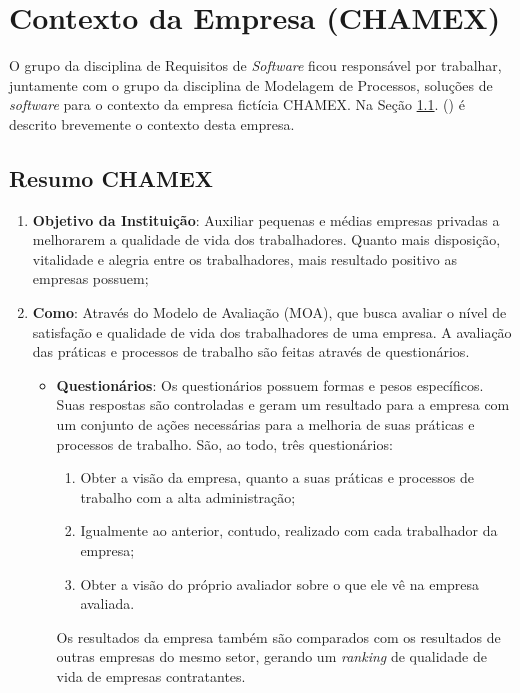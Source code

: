 \chapter[Contexto da Empresa (CHAMEX)]{Contexto da Empresa (CHAMEX)}
\label{chap:contexto}
	O grupo da disciplina de Requisitos de \emph{Software} ficou responsável por trabalhar, juntamente com o grupo da disciplina de Modelagem de Processos, soluções de \emph{software} para o contexto da empresa fictícia CHAMEX. Na Seção \ref{sec:contexto_resumo}. () é descrito brevemente o contexto desta empresa.

	\section[Resumo CHAMEX]{Resumo CHAMEX}
	\label{sec:contexto_resumo}
		\begin{enumerate}
			\item{\textbf{Objetivo da Instituição}: Auxiliar pequenas e médias empresas privadas a melhorarem a qualidade de vida dos trabalhadores. Quanto mais disposição, vitalidade e alegria entre os trabalhadores, mais resultado positivo as empresas possuem;}
			\item{\textbf{Como}: Através do Modelo de Avaliação (MOA), que busca avaliar o nível de satisfação e qualidade de vida dos trabalhadores de uma empresa. A avaliação das práticas e processos de trabalho são feitas através de questionários.
				\begin{itemize}
					\item{\textbf{Questionários}: Os questionários possuem formas e pesos específicos. Suas respostas são controladas e geram um resultado para a empresa com um conjunto de ações necessárias para a melhoria de suas práticas e processos de trabalho. São, ao todo, três questionários:
					\begin{enumerate}
						\item{Obter a visão da empresa, quanto a suas práticas e processos de trabalho com a alta administração;}
						\item{Igualmente ao anterior, contudo, realizado com cada trabalhador da empresa;}
						\item{Obter a visão do próprio avaliador sobre o que ele vê na empresa avaliada.}
					\end{enumerate}
					Os resultados da empresa também são comparados com os resultados de outras empresas do mesmo setor, gerando um \emph{ranking} de qualidade de vida de empresas contratantes.}
				\end{itemize}}
		\end{enumerate}